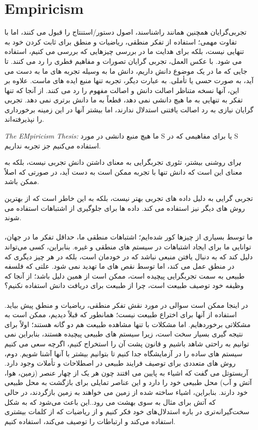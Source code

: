 \documentclass[10pt,a4paper]{article}
\newenvironment{callout}
	{\begin{calloutbox}\color{charcoal}\textbf\textit}
	{\end{calloutbox}}
\begin{document}
            \section{Empiricism}
                تجربی‌گرایان همچنین همانند راشناسند، اصول دستور/استنتاج را قبول می کنند، اما با تفاوت مهمی؛ استفاده از تفکر منطقی، ریاضیات و منطق برای ثابت کردن خود به تنهایی نیست، بلکه برای هدایت ما در بررسی چیزهایی که بررسی می کنیم، استفاده می شود. با عکس العمل، تجربی گرایان تصورات و مفاهیم فطری را رد می کنند. تا جایی که ما در یک موضوع دانش داریم، دانش ما به وسیله تجربه های ما به دست می آید، به صورت حسی یا تأملی. به عبارت دیگر، تجربه تنها منبع ایده های ماست. علاوه بر این، آنها نسخه متناظر اصالت دانش و اصالت مفهوم را رد می کنند. از آنجا که تنها تفکر به تنهایی به ما هیچ دانشی نمی دهد، قطعاً به ما دانش برتری نمی دهد. تجربی گرایان نیازی به رد اصالت یافتنی استدلال ندارند، اما بیشتر آنها در این زمینه برخورداری را نپذیرفته‌اند.\cite{sep-rationalism-empiricism}
                \begin{define}
                    \textit{The EMpiricism Thesis: }ما هیچ منبع دانشی در مورد S یا برای مفاهیمی که در S استفاده می‌کنیم جز تجربه نداریم.
                \end{define}
                \begin{callout}
                    برای روشنی بیشتر، تئوری تجربگرایی به معنای داشتن دانش تجربی نیست، بلکه به معنای این است که دانش تنها با تجربه ممکن است به دست آید، در صورتی که اصلاً ممکن باشد.
                \end{callout}
تجربی گرایی به دلیل داده های تجربی بهتر نیست، بلکه به این خاطر است که از بهترین روش های دیگر نیز استفاده می کند. داده ها برای جلوگیری از اشتباهات استفاده می شوند.
                \\
                \\
ما توسط بسیاری از چیزها کور شده‌ایم؛ اشتباهات منطقی ما، حداقل تفکر ما در جهان، توانایی ما برای ایجاد اشتباهات در سیستم های منطقی و غیره. بنابراین، کسی می‌تواند دلیل کند که به دنبال یافتن منبعی نباشد که در خودمان است، بلکه در هر چیز دیگری که در منطق عمل می کند، اما توسط نقص های ما تهدید نمی شود. علتی که فلسفه طبیعی به سمت تجربگرایی پیچیده است، ممکن است از همین دلیل باشد؛ از آنجا که وظیفه خود توصیف طبیعت است، چرا از طبیعت برای دریافت دانش استفاده نکنیم؟
                \\
                \\
در اینجا ممکن است سوالی در مورد نقش تفکر منطقی، ریاضیات و منطق پیش بیاید. استفاده از آنها برای اختراع طبیعت نیست؛ همانطور که قبلاً دیدیم، ممکن است به مشکلاتی برخوردهایم. اما مشکلات با تنها مشاهده طبیعت هم دو گانه هستند؛ اولاً برای نتیجه گیری بسیار سخت است، زیرا سیستم های طبیعی پیچیده هستند، بنابراین نمی توانیم به راحتی شاهد باشیم و قانون پشت آن را استخراج کنیم، اگرچه سعی می کنیم سیستم های ساده را در آزمایشگاه جدا کنیم تا بتوانیم بیشتر با آنها آشنا شویم. دوم، روش های متعددی برای توصیف فرایند طبیعی در اصطلاحات و تأملات وجود دارد. آریستوتل می گفت که اشیاء به پایین می افتند چون هر یک از چهار عنصر (زمین، هوا، آتش و آب) محل طبیعی خود را دارد و این عناصر تمایلی برای بازگشت به محل طبیعی خود دارند. بنابراین، اشیاء ساخته شده از زمین می خواهند به زمین بازگردند، در حالی که آتش برای مثال به سوی بهشت می رود.\cite{greg-grav}.این باعث می‌شود که به شکل سخت‌گیرانه‌تری در باره استدلال‌های خود فکر کنیم و از ریاضیات که از کلمات بیشتری استفاده می‌کند و ارتباطات را توصیف می‌کند، استفاده کنیم.
\end{document}
